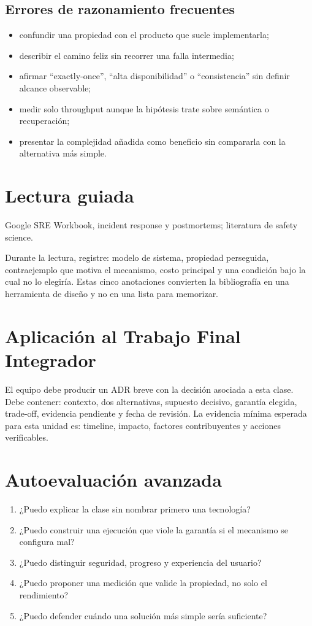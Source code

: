 \documentclass[variant=apuntes,cover=institutional,mode=screen]{ua-engineering-v6-article}
\begin{document}
\subsection{Errores de razonamiento frecuentes}
\begin{itemize}
\item confundir una propiedad con el producto que suele implementarla;
\item describir el camino feliz sin recorrer una falla intermedia;
\item afirmar ``exactly-once'', ``alta disponibilidad'' o ``consistencia'' sin definir alcance observable;
\item medir solo throughput aunque la hipótesis trate sobre semántica o recuperación;
\item presentar la complejidad añadida como beneficio sin compararla con la alternativa más simple.
\end{itemize}

\section{Lectura guiada}
Google SRE Workbook, incident response y postmortems; literatura de safety science.

Durante la lectura, registre: modelo de sistema, propiedad perseguida, contraejemplo que motiva el mecanismo, costo principal y una condición bajo la cual no lo elegiría. Estas cinco anotaciones convierten la bibliografía en una herramienta de diseño y no en una lista para memorizar.

\section{Aplicación al Trabajo Final Integrador}
El equipo debe producir un ADR breve con la decisión asociada a esta clase. Debe contener: contexto, dos alternativas, supuesto decisivo, garantía elegida, trade-off, evidencia pendiente y fecha de revisión. La evidencia mínima esperada para esta unidad es: timeline, impacto, factores contribuyentes y acciones verificables.

\section{Autoevaluación avanzada}
\begin{enumerate}
\item ¿Puedo explicar la clase sin nombrar primero una tecnología?
\item ¿Puedo construir una ejecución que viole la garantía si el mecanismo se configura mal?
\item ¿Puedo distinguir seguridad, progreso y experiencia del usuario?
\item ¿Puedo proponer una medición que valide la propiedad, no solo el rendimiento?
\item ¿Puedo defender cuándo una solución más simple sería suficiente?
\end{enumerate}
\end{document}
